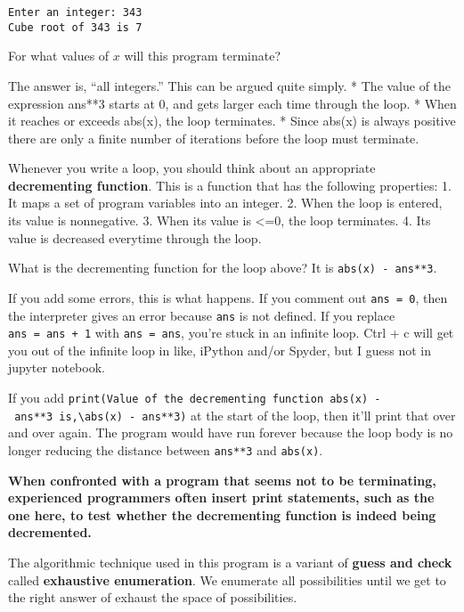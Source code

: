 \documentclass[11pt]{article}
\begin{document}
    \begin{Verbatim}[commandchars=\\\{\}]
Enter an integer: 343
Cube root of 343 is 7

    \end{Verbatim}

    For what values of \(x\) will this program terminate?

The answer is, ``all integers.'' This can be argued quite simply. * The
value of the expression ans**3 starts at 0, and gets larger each time
through the loop. * When it reaches or exceeds abs(x), the loop
terminates. * Since abs(x) is always positive there are only a finite
number of iterations before the loop must terminate.

Whenever you write a loop, you should think about an appropriate
\textbf{decrementing function}. This is a function that has the
following properties: 1. It maps a set of program variables into an
integer. 2. When the loop is entered, its value is nonnegative. 3. When
its value is \textless{}=0, the loop terminates. 4. Its value is
decreased everytime through the loop.

What is the decrementing function for the loop above? It is
\texttt{abs(x)\ -\ ans**3}.

If you add some errors, this is what happens. If you comment out
\texttt{ans\ =\ 0}, then the interpreter gives an error because
\texttt{ans} is not defined. If you replace \texttt{ans\ =\ ans\ +\ 1}
with \texttt{ans\ =\ ans}, you're stuck in an infinite loop. Ctrl + c
will get you out of the infinite loop in like, iPython and/or Spyder,
but I guess not in jupyter notebook.

If you add
\texttt{print(\textquotesingle{}Value\ of\ the\ decrementing\ function\ abs(x)\ -\ ans**3\ is\textquotesingle{},\textbackslash{}abs(x)\ -\ ans**3)}
at the start of the loop, then it'll print that over and over again. The
program would have run forever because the loop body is no longer
reducing the distance between \texttt{ans**3} and \texttt{abs(x)}.

\textbf{When confronted with a program that seems not to be terminating,
experienced programmers often insert print statements, such as the one
here, to test whether the decrementing function is indeed being
decremented.}

The algorithmic technique used in this program is a variant of
\textbf{guess and check} called \textbf{exhaustive enumeration}. We
enumerate all possibilities until we get to the right answer of exhaust
the space of possibilities.
\end{document}
